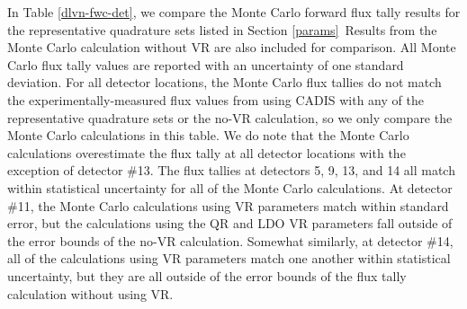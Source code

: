 \documentclass{article} %
\begin{document}
In Table \ref{dlvn-fwc-det}, we compare the Monte Carlo forward flux tally
results for the representative quadrature sets listed in Section \ref{params}\
Results from the Monte Carlo calculation without VR are also included for
comparison. All Monte Carlo flux tally values are reported with an uncertainty
of one standard deviation. For all detector locations, the Monte Carlo flux
tallies do not match the experimentally-measured flux values from using CADIS
with any of the representative quadrature sets or the no-VR calculation, so we
only compare the Monte Carlo calculations in this table. We do note that the
Monte Carlo calculations overestimate the flux tally at all detector locations
with the exception of detector \#13. The flux tallies at detectors 5, 9, 13,
and 14 all match within statistical uncertainty for all of the Monte Carlo
calculations. At detector \#11, the Monte Carlo calculations using VR
parameters match within standard error, but the calculations using the QR and
LDO VR parameters fall outside of the error bounds of the no-VR calculation.
Somewhat similarly, at detector \#14, all of the calculations using VR
parameters match one another within statistical uncertainty, but they are all
outside of the error bounds of the flux tally calculation without using VR.
\end{document}
